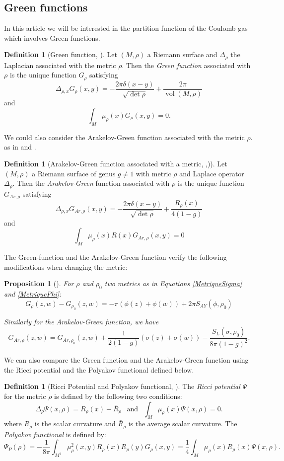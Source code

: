 \documentclass{article}
\newtheorem{Proposition}[theorem]{Proposition}
\theoremstyle{definition}
\newtheorem{Definition}[theorem]{Definition}
\theoremstyle{remark}
\DeclareMathOperator{\vol}{vol}
\begin{document}
\subsection{Green functions}
In this article we will be interested in the partition function of the Coulomb gas which involves Green functions.
\begin{Definition}[Green function, {\cite[p.352]{FERRARI-GravitaionMabuchi}}]
Let $(M,\rho)$ a Riemann surface and $\Delta_{\rho}$ the Laplacian associated with the metric $\rho$. Then the \emph {Green function} associated with $\rho$ is the unique function $G_{\rho}$ satisfying $$\Delta_{\rho,x} G_{\rho}(x,y)=-\frac{2\pi \delta(x-y)}{\sqrt{\det \rho}}+\frac{2\pi}{\vol(M,\rho)}$$ and $$\int_{M}\mu_{\rho}(x) G_{\rho}(x,y)=0.$$
\end{Definition}
We could also consider the Arakelov-Green function associated with the metric $\rho$. as in \cite{KlevtsovGenus} and \cite{DHokerPhongFunctionMandelstamDiag}.
\begin{Definition}[Arakelov-Green function associated with a metric, {\cite[eq. (4.38)]{KlevtsovGenus}},{\cite[eq (3.3),(3.4)]{DHokerPhongFunctionMandelstamDiag})}]\label{GreenAr}
Let $(M,\rho)$ a Riemann surface of genus $g\neq1$ with metric $\rho$ and Laplace operator $\Delta_{\rho}$. Then the \emph{Arakelov-Green} function associated with $\rho$ is the unique function $G_{Ar,\rho}$ satisfying $$\Delta_{\rho,x} G_{Ar,\rho}(x,y)=-\frac{2\pi\delta(x-y)}{\sqrt{\det \rho}}+\frac{R_{\rho}(x)}{4(1-g)}$$ and $$\int_{M}\mu_{\rho}(x)R(x)G_{Ar,\rho}(x,y)=0$$
\end{Definition}

The Green-function and the Arakelov-Green function verify the following modifications when changing the metric:

\begin{Proposition}[{\cite[eq. (3.31)]{FERRARI-GravitaionMabuchi}}]\label{VarGreen}
    For $\rho$ and $\rho_{0}$ two metrics as in Equations \eqref{MetriqueSigma} and \eqref{MetriquePhi}: $$G_{\rho}(z,w)-G_{\rho_{0}}(z,w)=-\pi (\phi(z)+\phi(w))+2\pi S_{AY}(\phi,\rho_{0})$$

Similarly for the Arakelov-Green function, we have $$G_{Ar,\rho}(z,w)=G_{Ar,\rho_{0}}(z,w)+\frac{1}{2(1-g)}(\sigma(z)+\sigma(w))-\frac{S_{L}(\sigma,\rho_{0})}{8\pi(1-g)^{2}} .$$
\end{Proposition}
We can also compare the Green function and the Arakelov-Green function using the Ricci potential and the Polyakov functional defined below. 
\begin{Definition}[Ricci Potential and Polyakov functional, {\cite[eq. (3.10)-(3.11), (3.46)]{FERRARI-GravitaionMabuchi}}]\label{PotRicci}  
    The \emph{Ricci potential} \(\Psi\) for the metric \(\rho\) is defined by the following two conditions:  
    $$\Delta_{\rho}\Psi(x,\rho)=R_{\rho}(x)-\bar{R}_{\rho} ~~\text{ and }~~\int_{M}\mu_{\rho}(x) \Psi(x,\rho)=0.$$  
    where $R_{\rho}$ is the scalar curvature and $\bar{R}_{\rho}$ is the average scalar curvature.  
The \emph{Polyakov functional} is defined by:  
    $$\Psi_{P}(\rho)=-\frac{1}{8\pi}\int_{M^{2}}\mu_{\rho}^{2}(x,y)R_{\rho}(x)R_{\rho}(y)G_{\rho}(x,y)=\frac{1}{4}\int_{M}\mu_{\rho}(x)R_{\rho}(x)\Psi(x,\rho).$$  
\end{Definition}
\end{document}

